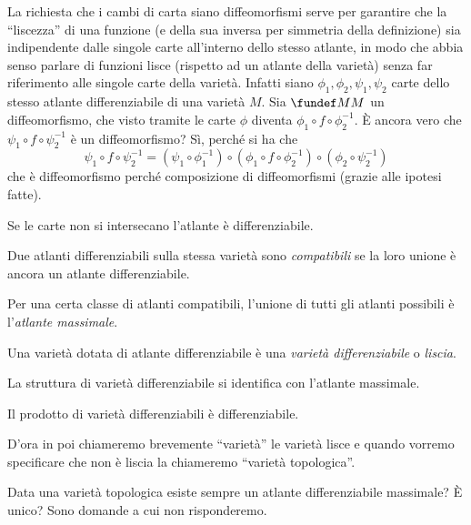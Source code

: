\begin{oss}
	La richiesta che i cambi di carta siano diffeomorfismi
	serve per garantire che la ``liscezza'' di una funzione
	(e della sua inversa per simmetria della definizione)
	sia indipendente dalle singole carte all'interno dello stesso atlante,
	in modo che abbia senso parlare di funzioni lisce
	(rispetto ad un atlante della varietà)
	senza far riferimento alle singole carte della varietà.
	Infatti siano $\phi_1, \phi_2, \psi_1, \psi_2$
	carte dello stesso atlante differenziabile di una varietà $M$.
	Sia $\fundef MM$ un diffeomorfismo,
	che visto tramite le carte $\phi$ diventa $\phi_1\circ f\circ \phi_2^{-1}$.
	È ancora vero che $\psi_1 \circ f \circ \psi_2^{-1}$ è un diffeomorfismo?
	Sì, perché si ha che 
	\begin{equation*}
		\psi_1 \circ f \circ \psi_2^{-1} =
		(\psi_1\circ\phi_1^{-1}) \circ (\phi_1\circ f\circ\phi_2^{-1}) \circ (\phi_2\circ\psi_2^{-1})
	\end{equation*} 
	che è diffeomorfismo perché composizione di diffeomorfismi (grazie alle ipotesi fatte).
\end{oss}

\begin{oss}
	Se le carte non si intersecano l'atlante è differenziabile.
\end{oss}

\begin{defn}
	Due atlanti differenziabili sulla stessa varietà sono \emph{compatibili}
	se la loro unione è ancora un atlante differenziabile.
\end{defn}

\begin{defn}
	Per una certa classe di atlanti compatibili,
	l'unione di tutti gli atlanti possibili è l'\emph{atlante massimale}.
\end{defn}

\begin{defn}
	Una varietà dotata di atlante differenziabile è una \emph{varietà differenziabile} o \emph{liscia}.
\end{defn}

\begin{oss}
	La struttura di varietà differenziabile si identifica con l'atlante massimale.
\end{oss}

\begin{fat}
	Il prodotto di varietà differenziabili è differenziabile.
\end{fat}

D'ora in poi chiameremo brevemente ``varietà'' le varietà lisce
e quando vorremo specificare che non è liscia la chiameremo ``varietà topologica''.

Data una varietà topologica esiste sempre un atlante differenziabile massimale? È unico?
Sono domande a cui non risponderemo.
